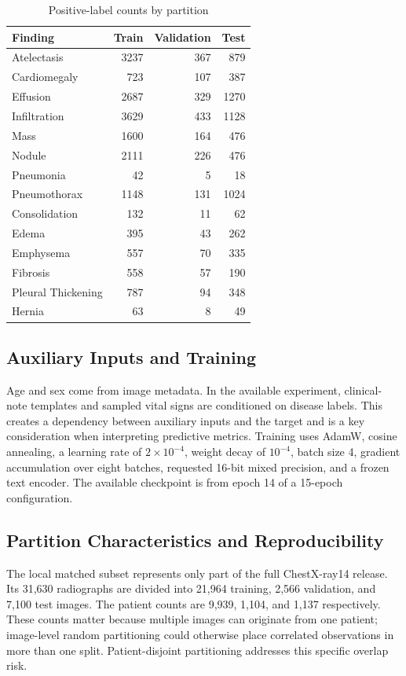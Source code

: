 \documentclass[conference,letterpaper]{IEEEtran}
\begin{document}
\begin{table}[t]
\caption{Positive-label counts by partition}\label{tab:prevalence}
\centering\footnotesize
\begin{tabular}{lrrr}\toprule
Finding & Train & Validation & Test\\\midrule
Atelectasis & 3237 & 367 & 879\\
Cardiomegaly & 723 & 107 & 387\\
Effusion & 2687 & 329 & 1270\\
Infiltration & 3629 & 433 & 1128\\
Mass & 1600 & 164 & 476\\
Nodule & 2111 & 226 & 476\\
Pneumonia & 42 & 5 & 18\\
Pneumothorax & 1148 & 131 & 1024\\
Consolidation & 132 & 11 & 62\\
Edema & 395 & 43 & 262\\
Emphysema & 557 & 70 & 335\\
Fibrosis & 558 & 57 & 190\\
Pleural Thickening & 787 & 94 & 348\\
Hernia & 63 & 8 & 49\\\bottomrule
\end{tabular}
\end{table}

\subsection{Auxiliary Inputs and Training}
Age and sex come from image metadata. In the available experiment, clinical-note templates and sampled vital signs are conditioned on disease labels. This creates a dependency between auxiliary inputs and the target and is a key consideration when interpreting predictive metrics. Training uses AdamW, cosine annealing, a learning rate of $2\times10^{-4}$, weight decay of $10^{-4}$, batch size 4, gradient accumulation over eight batches, requested 16-bit mixed precision, and a frozen text encoder. The available checkpoint is from epoch 14 of a 15-epoch configuration.

\subsection{Partition Characteristics and Reproducibility}
The local matched subset represents only part of the full ChestX-ray14 release. Its 31,630 radiographs are divided into 21,964 training, 2,566 validation, and 7,100 test images. The patient counts are 9,939, 1,104, and 1,137 respectively. These counts matter because multiple images can originate from one patient; image-level random partitioning could otherwise place correlated observations in more than one split. Patient-disjoint partitioning addresses this specific overlap risk.
\end{document}
